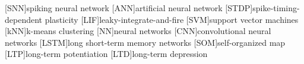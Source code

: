 \begin{acronym}[XXXX]
    [SNN]{spiking neural network}
    [ANN]{artificial neural network}
    [STDP]{spike-timing-dependent plasticity}
    [LIF]{leaky-integrate-and-fire}
    [SVM]{support vector machines}
    [kNN]{k-means clustering}
    [NN]{neural networks}
    [CNN]{convolutional neural networks}
    [LSTM]{long short-term memory networks}
    [SOM]{self-organized map}
    [LTP]{long-term potentiation}
    [LTD]{long-term depression}
\end{acronym}